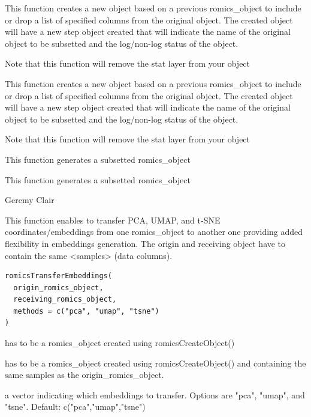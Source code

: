 \documentclass[a4paper]{book}
\begin{document}
\begin{Details}
This function creates a new object based on a previous romics\_object to include or drop a list of specified columns from the original object. The created object will have a new step object created that will indicate the name of the original object to be subsetted and the log/non-log status of the object.

Note that this function will remove the stat layer from your object

This function creates a new object based on a previous romics\_object to include or drop a list of specified columns from the original object. The created object will have a new step object created that will indicate the name of the original object to be subsetted and the log/non-log status of the object.

Note that this function will remove the stat layer from your object
\end{Details}
%
\begin{Value}
This function generates a subsetted romics\_object

This function generates a subsetted romics\_object
\end{Value}
%
\begin{Author}
Geremy Clair
\end{Author}
%
\begin{Description}
This function enables to transfer PCA, UMAP, and t-SNE coordinates/embeddings from one romics\_object
to another one providing added flexibility in embeddings generation. The origin and receiving object
have to contain the same <samples> (data columns).
\end{Description}
%
\begin{Usage}
\begin{verbatim}
romicsTransferEmbeddings(
  origin_romics_object,
  receiving_romics_object,
  methods = c("pca", "umap", "tsne")
)
\end{verbatim}
\end{Usage}
%
\begin{Arguments}
\begin{ldescription}
\item[\code{origin\_romics\_object}] has to be a romics\_object created using romicsCreateObject()

\item[\code{receiving\_romics\_object}] has to be a romics\_object created using romicsCreateObject() and containing the same samples as the origin\_romics\_object.

\item[\code{methods}] a vector indicating which embeddings to transfer. Options are "pca", "umap", and "tsne". Default: c("pca","umap","tsne")
\end{ldescription}
\end{Arguments}
\end{document}
